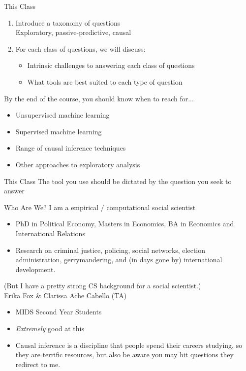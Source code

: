 \documentclass[11pt]{beamer}
\begin{document}
\begin{frame}[c]{This Class}
\begin{enumerate}
  \item Introduce a taxonomy of questions \\
  {\color{gray} Exploratory, passive-predictive, causal}
  \pause \item \alert{For each class of questions}, we will discuss:
  \begin{itemize}
    \item Intrinsic challenges to answering each class of questions
    \item What tools are best suited to each type of question
  \end{itemize}
\end{enumerate}
  \pause   By the end of the course, you should know when to reach for...
  \begin{itemize}
    \pause \item Unsupervised machine learning
    \item Supervised machine learning
    \item Range of causal inference techniques
    \item Other approaches to exploratory analysis
  \end{itemize}
\end{frame}


\begin{frame}[c]{This Class}
The tool you use should be dictated by the question you seek to answer
\end{frame}


\begin{frame}[c]{Who Are We?}
  I am a empirical / computational social scientist
  \begin{itemize}
      \pause \item PhD in Political Economy, Masters in Economics, BA in Economics and International Relations
  \item Research on criminal justice, policing, social networks, election administration, gerrymandering, and (in days gone by) international development. 
  \end{itemize}
  \pause (But I have a pretty strong CS background for a social scientist.)\\
\vspace*{0.2cm}
\pause Erika Fox \& Clarissa Ache Cabello (TA) 
\begin{itemize}
  \pause \item MIDS Second Year Students
   \item \emph{Extremely} good at this
   \pause \item Causal inference is a discipline that people spend their careers studying, so they are terrific resources, but also be aware you may hit questions they redirect to me. 
\end{itemize}
\end{frame}
\end{document}
